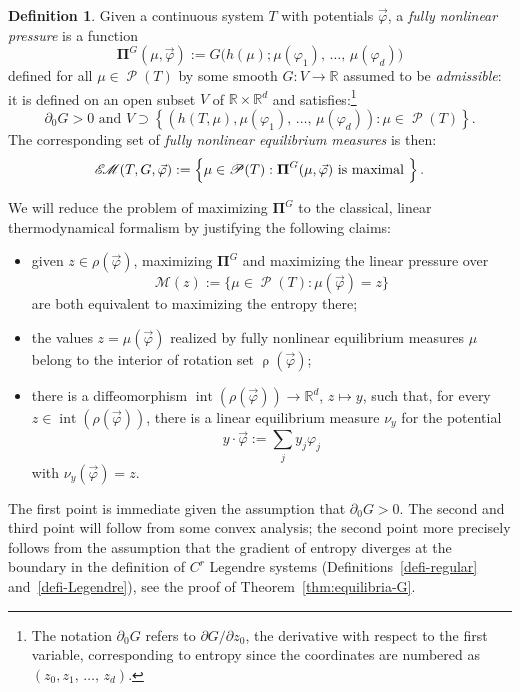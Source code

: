 \documentclass[10pt]{amsart}
\theoremstyle{definition}\newtheorem{defi}[theo]{Definition}\newtheorem{rema}[theo]{Remark}\newtheorem{exam}[theo]{Example}\newtheorem{exem}[theo]{Example}\newtheorem{nota}[theo]{Notation}
\theoremstyle{plain}
\theoremstyle{plain}
\newcommand\FNLP{\boldsymbol{\Pi}}
\newcommand\vpot{\vec\pot}
\newcommand\Prob{{\operatorname{\mathscr{P}}}}
\newcommand{\rs}{\operatorname{\rho}}
\newcommand{\EM}{\mathscr{E\kern-2pt M}}
\newcommand{\pot}{\varphi}
\newcommand*\8{\infty}
\newcommand\RR{\mathbb{R}}
\newcommand{\cM}{\mathcal{M}}
\begin{document}
\begin{defi}\label{def-fully-nonlin}
Given a continuous system $T$ with potentials $\vpot$, a \emph{fully nonlinear pressure} is a function
\begin{equation}\label{eq-G}
\FNLP^G(\mu,\vpot) := G\big(h(\mu); \mu(\pot_1),\,\dots,\,\mu(\pot_d)\big)
\end{equation}
defined for all $\mu\in\Prob(T)$ {by} some smooth $G:V \to\RR$ assumed to be \emph{admissible}: it is defined on an open subset $V$ of $\RR\times\RR^{d}$ and satisfies:\footnote{The notation $\partial_0G$ refers to $\partial G/\partial z_{0}$, the derivative with respect to the first variable, corresponding to entropy since the coordinates are numbered as $(z_0,z_1,\,\dots,\,z_d)$.}
\[
\partial_0G>0
\text{ and } V\supset\left\{(h(T,\mu),\mu(\pot_1),\,\dots,\,\mu(\pot_d)):\mu\in\Prob(T)\right\}.
\]
The corresponding set of \emph{fully nonlinear equilibrium measures} is then:
\[
\EM(T,G,\vpot) := \left\{\mu\in\Prob(T):\FNLP^G(\mu,\vpot)\text{ is maximal }\right\}.
\]
\end{defi}

We will reduce the problem of maximizing $\FNLP^G$ to the classical, linear thermodynamical formalism by justifying the following claims:
\begin{itemize}
\item[$(\ast)$] given ${z}\in\rho(\vpot)$, maximizing $\FNLP^G$ and maximizing the linear pressure over
\[
\cM(z):=\{\mu\in\Prob(T):\mu(\vpot)= z\}
\]
are both equivalent to maximizing the entropy there;
\item[$(\ast\ast)$] the values $z=\mu(\vpot)$ realized by fully nonlinear equilibrium measures $\mu$ belong to the interior of rotation set $\rs(\vpot)$;
\item[$(\ast\ast\ast)$] there is a diffeomorphism $\operatorname{int}(\rho(\vpot))\to\RR^d$, ${z}\mapsto{y}$, such that, for every ${z}\in\operatorname{int}(\rho(\vpot))$, there is a linear equilibrium measure $\nu_{ y}$ for the potential
\[
{y}\cdot\vpot:=\sum_j y_j\pot_j
\]
with $\nu_y(\vpot)= z$.
\end{itemize}
The first point is immediate given the assumption that $\partial_0 G>0$. The second and third point will follow from some convex analysis; the second point more precisely follows from the assumption that the gradient of entropy diverges at the boundary in the definition of $C^r$ Legendre systems (Definitions~\ref{defi-regular} and~\ref{defi-Legendre}), see the proof of Theorem~\ref{thm:equilibria-G}.
\end{document}
